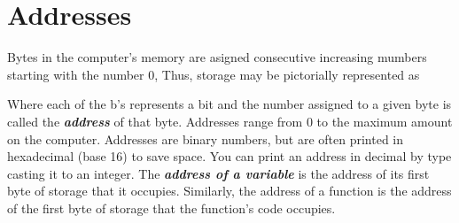 \documentclass{report}
\begin{document}
\section{Addresses}
Bytes in the computer's memory are asigned consecutive increasing mumbers starting with the number 0, Thus, storage may be pictorially represented as
\begin{figure}[ht]
    \centering
\end{figure}
\bigbreak \noindent
Where each of the b's represents a bit and the number assigned to a given byte is called the \textit{\textbf{address}} of that byte. Addresses range from 0 to the maximum amount on the computer. Addresses are binary numbers, but are often printed in hexadecimal (base 16) to save space. You can print an address in decimal by type casting it to an integer.
\bigbreak \noindent
The \textit{\textbf{address of a variable}} is the address of its first byte of storage that it occupies. Similarly, the address of a function is the address of the first byte of storage that the function's code occupies. \vspace{1.5mm}
\end{document}
